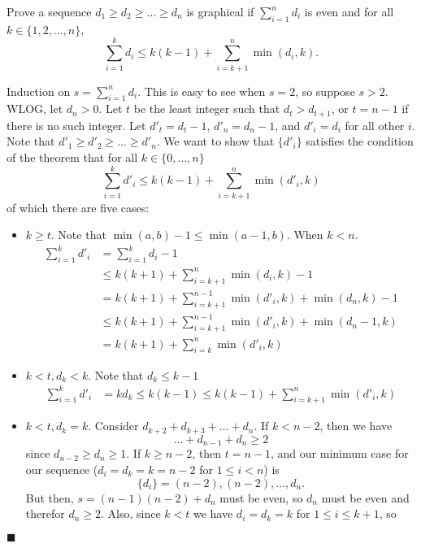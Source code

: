 \documentclass[12pt]{article}
\author{Warren Atkison}
\date{\today}
\renewcommand{\qed}{\hfill$\blacksquare$}
\renewenvironment{proof}{\vspace{1em}\begin{addmargin}[2em]{0em}\begin{newproof}}{\end{newproof}\end{addmargin}\qed}
\newenvironment{exercise}[2][Exercise]{\begin{trivlist}
\item[\hskip \labelsep {\bfseries #1} \hskip \labelsep {\bfseries #2.}]}{\end{trivlist}}
\begin{document}
\fancyhf{}
\fancyhead[R]{\today}
\fancyfoot[R]{\thepage}

\begin{exercise}{5.1.13 (3pt)}
	Prove a sequence $d_1 \ge d_2 \ge \ldots \ge d_n$ is graphical if $\sum_{i=1}^n d_i$ is even and for all $k \in \{1,2,\ldots,n\}$,
	\[
		\sum_{i=1}^k d_i \le  k(k-1) + \sum_{i=k+1}^n \min(d_i,k).
	\]
\end{exercise}
\begin{proof}
	Induction on $s = \sum_{i=1}^n d_i$. This is easy to see when $s = 2$, so suppose $s > 2$. WLOG, let $d_n > 0$. Let $t$ be the least integer such that $d_t > d_{t+1}$, or $t=n-1$ if there is no such integer. Let $d'_t = d_t - 1$, $d'_n = d_n - 1$, and $d'_i=d_i$ for all other $i$. Note that $d'_1 \ge d'_2 \ge \ldots \ge d'_n$. We want to show that $\{d'_i\}$ satisfies the condition of the theorem that for all $k \in \{0,\ldots,n\}$
	\[
		\sum_{i=1}^k d'_i \le k(k-1) + \sum_{i=k+1}^n \min(d'_i,k)
	\]
	of which there are five cases:
	\begin{itemize}
		\item[1.] $k \ge t$. Note that $\min(a,b) - 1 \le \min(a-1,b)$. When $k < n$.
			\begin{align*}
				\sum_{i=1}^k d'_i &= \sum_{i=1}^k d_i - 1 \\
						  &\le k(k+1) + \sum_{i=k+1}^n \min(d_i,k) - 1 \\
						  &= k(k+1) + \sum_{i=k+1}^{n-1} \min(d'_i,k) + \min(d_n,k) - 1 \\
						  &\le k(k+1) + \sum_{i=k+1}^{n-1} \min(d'_i,k) + \min(d_n - 1,k) \\
						  &= k(k+1) + \sum_{i=k}^{n} \min(d'_i,k)
			\end{align*}
		\item[2.] $k < t,d_k < k$. Note that $d_k \le k - 1$
			\begin{align*}
				\sum_{i=1}^k d'_i &= kd_k \le k(k-1) \le k(k-1) + \sum_{i=k+1}^{n} \min(d'_i,k)
			\end{align*}
		\item[3.] $k < t,d_k = k$. Consider $d_{k+2} + d_{k+3} + \ldots + d_n$. If $k < n - 2$, then we have
			\[
				\ldots + d_{n-1} + d_n \ge 2
			\]
			since $d_{n-2} \ge d_n \ge 1$. If $k \ge n - 2$, then $t = n - 1$, and our minimum case for our sequence ($d_i = d_k = k = n-2$ for $1\le i < n$) is
			\[
				\{d_i\} = (n-2), (n-2), \ldots, d_n.
			\]
			But then, $s = (n-1)(n-2) + d_n$ must be even, so $d_n$ must be even and therefor $d_n \ge 2$. Also, since $k<t$ we have $d_i = d_k = k$ for $1 \le i \le k+1$, so

\end{itemize}
\end{proof}
\end{document}
